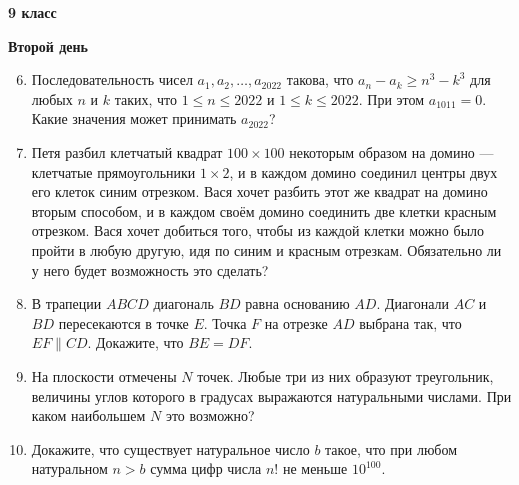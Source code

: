 \documentclass{article}
\begin{document}
\large
	
\begin{center}
	\LARGE\textbf{9 класс}
\end{center}
\begin{center}
	\large\textbf{Второй день}
\end{center}


\begin{enumerate}[label*=9.{\arabic{enumi}}]
\setcounter{enumi}{5}

\item Последовательность чисел $a_1, a_2, \dotsc , a_{2022}$ такова, что $a_n - a_k \geqslant n^3 - k^3$ для любых $n$ и $k$ таких, что $1 \leqslant n \leqslant 2022$ и $1 \leqslant k \leqslant 2022$. При этом $a_{1011} = 0$. Какие значения может принимать $a_{2022}$? 

\item  Петя разбил клетчатый квадрат $100 \times 100$ некоторым образом на домино — клетчатые прямоугольники $1 \times 2$, и в каждом домино соединил центры двух его клеток синим отрезком. Вася хочет разбить этот же квадрат на домино вторым способом, и в каждом своём домино соединить две клетки красным отрезком. Вася хочет добиться того, чтобы из каждой клетки можно было пройти в любую другую, идя по синим и красным отрезкам. Обязательно ли у него будет возможность это сделать?

\item  В трапеции $ABCD$ диагональ $BD$ равна основанию $AD$. Диагонали $AC$ и $BD$ пересекаются в точке $E$. Точка $F$ на отрезке $AD$ выбрана так, что $EF \parallel CD$. Докажите, что $BE = DF$.

\item На плоскости отмечены $N$ точек. Любые три из них образуют треугольник, величины углов которого в градусах выражаются натуральными числами. При каком наибольшем $N$ это возможно?

\item Докажите, что существует натуральное число $b$ такое, что при любом натуральном $n > b$ сумма цифр числа $n!$ не меньше $10^{100}$.

\end{enumerate}
\end{document}
